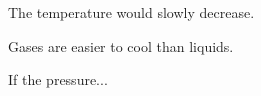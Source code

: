 The temperature would slowly decrease.  

Gases are easier to cool than liquids.  

If the pressure...